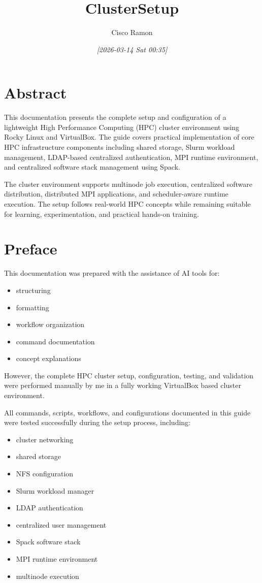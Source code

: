 \documentclass[11pt]{article}
\author{Cisco Ramon}
\date{\textit{{[}2026-03-14 Sat 00:35]}}
\title{ClusterSetup}
\begin{document}
\maketitle
\setcounter{tocdepth}{2}
\tableofcontents

\section{Abstract}
\label{sec:orga54c2b8}

This documentation presents the complete setup and configuration of a
lightweight High Performance Computing (HPC) cluster environment using
Rocky Linux and VirtualBox. The guide covers practical implementation
of core HPC infrastructure components including shared storage, Slurm
workload management, LDAP-based centralized authentication, MPI runtime
environment, and centralized software stack management using Spack.

The cluster environment supports multinode job execution, centralized
software distribution, distributed MPI applications, and scheduler-aware
runtime execution. The setup follows real-world HPC concepts while
remaining suitable for learning, experimentation, and practical hands-on
training.
\section{Preface}
\label{sec:org79910ac}

This documentation was prepared with the assistance of AI tools for:

\begin{itemize}
\item structuring
\item formatting
\item workflow organization
\item command documentation
\item concept explanations
\end{itemize}

However, the complete HPC cluster setup, configuration, testing, and
validation were performed manually by me in a fully working VirtualBox
based cluster environment.

All commands, scripts, workflows, and configurations documented in this
guide were tested successfully during the setup process, including:

\begin{itemize}
\item cluster networking
\item shared storage
\item NFS configuration
\item Slurm workload manager
\item LDAP authentication
\item centralized user management
\item Spack software stack
\item MPI runtime environment
\item multinode execution
\end{itemize}
\end{document}
